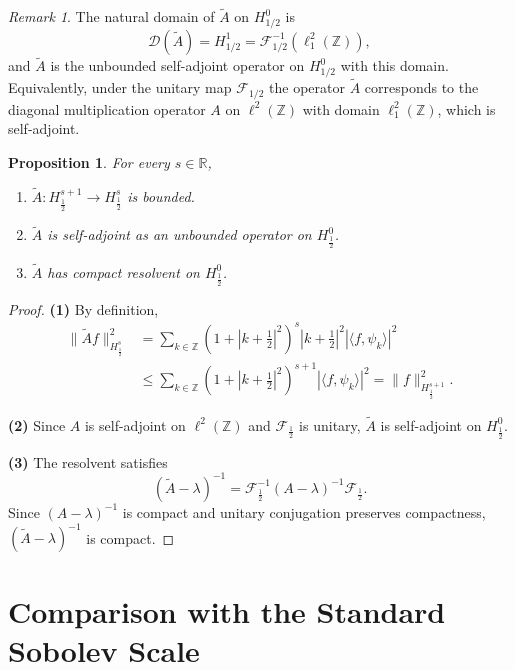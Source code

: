 \documentclass[11pt]{amsart}
\newtheorem{proposition}[theorem]{Proposition}
\theoremstyle{definition}
\theoremstyle{remark}
\newtheorem{remark}[theorem]{Remark}
\begin{document}
\begin{remark}
\label{rem:domain-core}
The natural domain of $\widetilde{A}$ on $H^0_{1/2}$ is
\[
\mathcal{D}(\widetilde{A})=H^1_{1/2}=\mathcal{F}_{1/2}^{-1}(\ell^2_1(\mathbb{Z})),
\]
and $\widetilde{A}$ is the unbounded self-adjoint operator on $H^0_{1/2}$ with this domain. Equivalently, under the unitary map $\mathcal{F}_{1/2}$ the operator $\widetilde{A}$ corresponds to the diagonal multiplication operator $A$ on $\ell^2(\mathbb{Z})$ with domain $\ell^2_1(\mathbb{Z})$, which is self-adjoint.
\end{remark}


\begin{proposition}
\label{prop:lifted-operator}
For every $s \in \mathbb{R}$,
\begin{enumerate}
\item $\widetilde{A} : H^{s+1}_{\frac{1}{2}} \to H^s_{\frac{1}{2}}$ is bounded.
\item $\widetilde{A}$ is self-adjoint as an unbounded operator on $H^0_{\frac{1}{2}}$.
\item $\widetilde{A}$ has compact resolvent on $H^0_{\frac{1}{2}}$.
\end{enumerate}
\end{proposition}

\begin{proof}
\textbf{(1)} By definition,
\begin{align*}
\|\widetilde{A} f\|_{H^s_{\frac{1}{2}}}^2
&= \sum_{k\in\mathbb{Z}} (1+|k+\tfrac{1}{2}|^2)^s |k+\tfrac{1}{2}|^2 |\langle f,\psi_k\rangle|^2 \\
&\le \sum_{k\in\mathbb{Z}} (1+|k+\tfrac{1}{2}|^2)^{s+1} |\langle f,\psi_k\rangle|^2
= \|f\|_{H^{s+1}_{\frac{1}{2}}}^2.
\end{align*}


\textbf{(2)} Since $A$ is self-adjoint on $\ell^2(\mathbb{Z})$ and $\mathcal{F}_{\frac{1}{2}}$ is unitary, $\widetilde{A}$ is self-adjoint on $H^0_{\frac{1}{2}}$.

\textbf{(3)} The resolvent satisfies
\[
(\widetilde{A} - \lambda)^{-1} = \mathcal{F}_{\frac{1}{2}}^{-1} (A - \lambda)^{-1} \mathcal{F}_{\frac{1}{2}}.
\]
Since $(A - \lambda)^{-1}$ is compact and unitary conjugation preserves compactness, $(\widetilde{A} - \lambda)^{-1}$ is compact.
\end{proof}

\section{Comparison with the Standard Sobolev Scale}
\label{sec:comparison}
\end{document}
